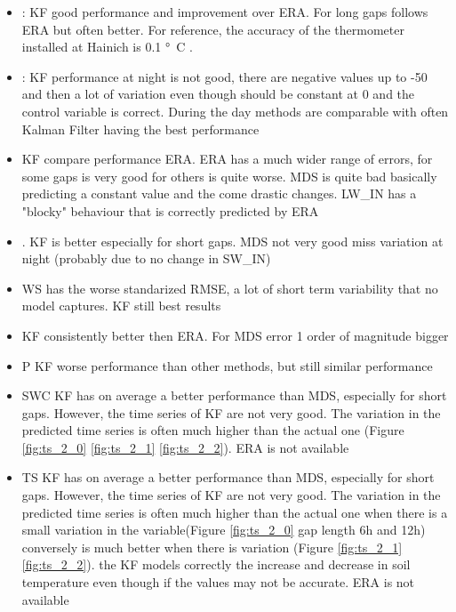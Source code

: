 \documentclass{article}
\begin{document}


\begin{itemize}
    \item {}: KF good performance and improvement over ERA. For long gaps follows ERA but often better. For reference, the accuracy of the thermometer installed at Hainich \cite{noauthor_associated_2020} is 0.1 \si{°C} \cite{noauthor_specification_nodate}.
    \item {}: KF performance at night is not good, there are negative values up to -50 and then a lot of variation even though should be constant at 0 and the control variable is correct. During the day methods are comparable with often Kalman Filter having the best performance 
    \item {} KF compare performance ERA. ERA has a much wider range of errors, for some gaps is very good for others is quite worse. MDS is quite bad basically predicting a constant value and the come drastic changes. LW\_IN has a "blocky" behaviour that is correctly predicted by ERA
    \item {}. KF is better especially for short gaps. MDS not very good miss variation at night (probably due to no change in SW\_IN)
    \item WS has the worse standarized RMSE, a lot of short term variability that no model captures. KF still best results 
    \item {} KF consistently better then ERA. For MDS error 1 order of magnitude bigger
    \item P KF worse performance than other methods, but still similar performance
    \item SWC KF has on average a better performance than MDS, especially for short gaps. However, the time series of KF are not very good. The variation in the predicted time series is often much higher than the actual one (Figure \ref{fig:ts_2_0} \ref{fig:ts_2_1} \ref{fig:ts_2_2}). ERA is not available
    \item TS KF has on average a better performance than MDS, especially for short gaps. However, the time series of KF are not very good. The variation in the predicted time series is often much higher than the actual one when there is a small variation in the variable(Figure \ref{fig:ts_2_0} gap length 6h and 12h) conversely is much better when there is variation (Figure \ref{fig:ts_2_1} \ref{fig:ts_2_2}). the KF models correctly the increase and decrease in soil temperature even though if the values may not be accurate. ERA is not available
    
\end{itemize}
\end{document}

